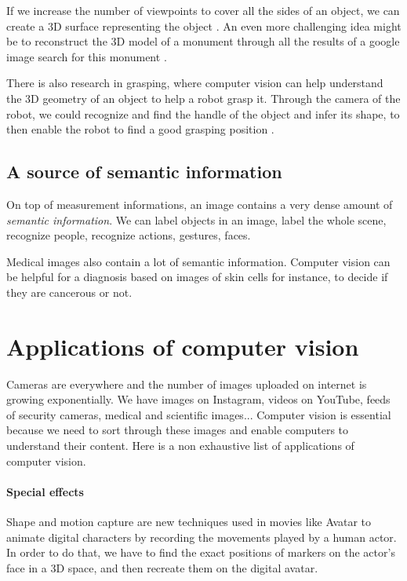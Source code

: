 \documentclass{article}
\begin{document}
If we increase the number of viewpoints to cover all the sides of an object, we can create a 3D surface representing the object \cite{multipleview}. An even more challenging idea might be to reconstruct the 3D model of a monument through all the results of a google image search for this monument \cite{multicommunity}.

There is also research in grasping, where computer vision can help understand the 3D geometry of an object to help a robot grasp it. Through the camera of the robot, we could recognize and find the handle of the object and infer its shape, to then enable the robot to find a good grasping position \cite{grasping}.


\subsection{A source of semantic information}

On top of measurement informations, an image contains a very dense amount of \textit{semantic information}. We can label objects in an image, label the whole scene, recognize people, recognize actions, gestures, faces.

Medical images also contain a lot of semantic information. Computer vision can be helpful for a diagnosis based on images of skin cells for instance, to decide if they are cancerous or not.



\section{Applications of computer vision} \label{applications}

Cameras are everywhere and the number of images uploaded on internet is growing exponentially. We have images on Instagram, videos on YouTube, feeds of security cameras, medical and scientific images... Computer vision is essential because we need to sort through these images and enable computers to understand their content. Here is a non exhaustive list of applications of computer vision.


\paragraph{Special effects}
Shape and motion capture are new techniques used in movies like Avatar to animate digital characters by recording the movements played by a human actor. In order to do that, we have to find the exact positions of markers on the actor's face in a 3D space, and then recreate them on the digital avatar.
\end{document}
